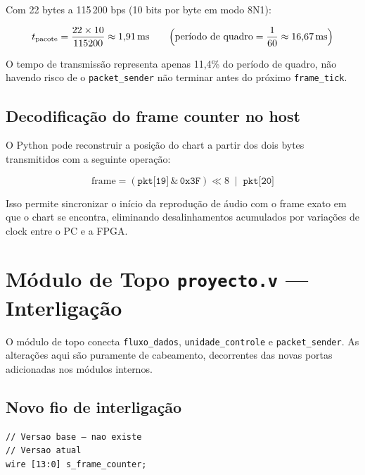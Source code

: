 \documentclass[12pt, a4paper]{article}
\newcommand{\vsig}[1]{\texttt{#1}}
\begin{document}
Com 22 bytes a 115\,200 bps (10 bits por byte em modo 8N1):

\begin{equation}
    t_{\text{pacote}} = \frac{22 \times 10}{115200} \approx 1{,}91\,\text{ms}
    \qquad \Bigl(\text{período de quadro} = \frac{1}{60} \approx 16{,}67\,\text{ms}\Bigr)
\end{equation}

O tempo de transmissão representa apenas 11,4\% do período de quadro,
não havendo risco de o \texttt{packet\_sender} não terminar antes do
próximo \vsig{frame\_tick}.

\subsection{Decodificação do frame counter no host}

O Python pode reconstruir a posição do chart a partir dos dois bytes
transmitidos com a seguinte operação:

\begin{equation}
    \text{frame} = (\texttt{pkt[19]} \,\&\, \texttt{0x3F}) \ll 8 \;\mid\; \texttt{pkt[20]}
\end{equation}

Isso permite sincronizar o início da reprodução de áudio com o frame exato
em que o chart se encontra, eliminando desalinhamentos acumulados por
variações de clock entre o PC e a FPGA.

\section{Módulo de Topo \texttt{proyecto.v} — Interligação}

O módulo de topo conecta \texttt{fluxo\_dados}, \texttt{unidade\_controle} e
\texttt{packet\_sender}. As alterações aqui são puramente de cabeamento,
decorrentes das novas portas adicionadas nos módulos internos.

\subsection{Novo fio de interligação}

\begin{lstlisting}[caption={Declaração do fio s\_frame\_counter}]
// Versao base — nao existe
// Versao atual
wire [13:0] s_frame_counter;
\end{lstlisting}
\end{document}
